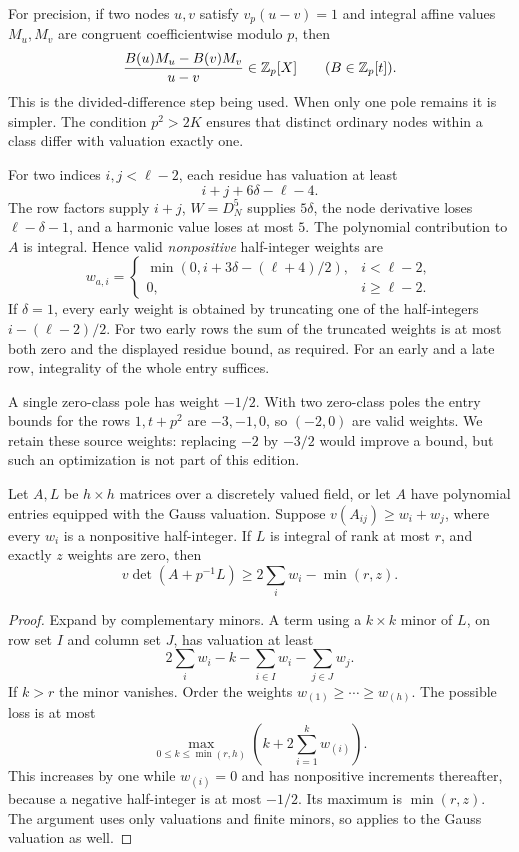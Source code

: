 For precision, if two nodes $u,v$ satisfy $v_p(u-v)=1$ and integral
affine values $M_u,M_v$ are congruent coefficientwise modulo $p$, then
\[
 \frac{B(u)M_u-B(v)M_v}{u-v}\in\mathbb Z_p[X]\qquad(B\in\mathbb Z_p[t]).
\]
This is the divided-difference step being used. When only one pole
remains it is simpler. The condition $p^2>2K$ ensures that distinct
ordinary nodes within a class differ with valuation exactly one.

For two indices $i,j<\ell-2$, each residue has valuation at least
\[
 i+j+6\delta-\ell-4.
\]
The row factors supply $i+j$, $W=D_N^5$ supplies $5\delta$, the node
derivative loses $\ell-\delta-1$, and a harmonic value loses at most
$5$. The polynomial contribution to $A$ is integral. Hence valid
\emph{nonpositive} half-integer weights are
\begin{equation}\label{eq:outerweights}
 w_{a,i}=\begin{cases}
 \min(0,i+3\delta-(\ell+4)/2),&i<\ell-2,\\
 0,&i\ge\ell-2.
 \end{cases}
\end{equation}
If $\delta=1$, every early weight is obtained by truncating one of the
half-integers $i-(\ell-2)/2$. For two early rows the sum of the truncated
weights is at most both zero and the displayed residue bound, as
required. For an early and a late row, integrality of the whole entry
suffices.

A single zero-class pole has weight $-1/2$. With two zero-class poles the
entry bounds for the rows $1,t+p^2$ are $-3,-1,0$, so $(-2,0)$ are valid
weights. We retain these source weights: replacing $-2$ by $-3/2$ would
improve a bound, but such an optimization is not part of this edition.

\begin{lemma}
\label{lem:rankcorrection}
Let $A,L$ be $h\times h$ matrices over a discretely valued field, or let
$A$ have polynomial entries equipped with the Gauss valuation. Suppose
$v(A_{ij})\ge w_i+w_j$, where every $w_i$ is a nonpositive half-integer.
If $L$ is integral of rank at most $r$, and exactly $z$ weights are zero,
then
\begin{equation}\label{eq:rankcorrection}
 v\det(A+p^{-1}L)\ge2\sum_iw_i-\min(r,z).
\end{equation}
\end{lemma}
\begin{proof}
Expand by complementary minors. A term using a $k\times k$ minor of
$L$, on row set $I$ and column set $J$, has valuation at least
\[
 2\sum_iw_i-k-\sum_{i\in I}w_i-\sum_{j\in J}w_j.
\]
If $k>r$ the minor vanishes. Order the weights
$w_{(1)}\ge\cdots\ge w_{(h)}$. The possible loss is at most
\[
 \max_{0\le k\le\min(r,h)}\left(k+2\sum_{i=1}^kw_{(i)}\right).
\]
This increases by one while $w_{(i)}=0$ and has nonpositive increments
thereafter, because a negative half-integer is at most $-1/2$. Its
maximum is $\min(r,z)$. The argument uses only valuations and finite
minors, so applies to the Gauss valuation as well.
\end{proof}

